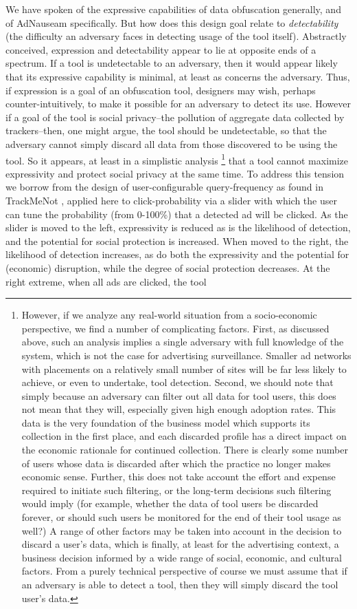 \documentclass[conference]{IEEEtran}
\begin{document}
We have spoken of the expressive capabilities of data obfuscation generally, and of AdNauseam specifically. But how does this design goal relate to \emph{detectability} (the difficulty an adversary faces in detecting usage of the tool itself). Abstractly conceived, expression and detectability appear to lie at opposite ends of a spectrum. If a tool is undetectable to an adversary, then it would appear likely that its expressive capability is minimal, at least as concerns the adversary. Thus, if expression is a goal of an obfuscation tool, designers may wish, perhaps counter-intuitively, to make it possible for an adversary to detect its use. However if a goal of the tool is social privacy--the pollution of aggregate data collected by trackers--then, one might argue, the tool should be undetectable, so that the adversary cannot simply discard all data from those discovered to be using the tool. So it appears, at least in a simplistic analysis \footnote{However, if we analyze any real-world situation from a socio-economic perspective, we find a number of complicating factors. First, as discussed above, such an analysis implies a single adversary with full knowledge of the system, which is not the case for advertising surveillance. Smaller ad networks with placements on a relatively small number of sites will be far less likely to achieve, or even to undertake, tool detection. Second, we should note that simply because an adversary can filter out all data for tool users, this does not mean that they will, especially given high enough adoption rates. This data is the very foundation of the business model which supports its collection in the first place, and each discarded profile has a direct impact on the economic rationale for continued collection. There is clearly some number of users whose data is discarded after which the practice no longer makes economic sense. Further, this does not take account the effort and expense required to initiate such filtering, or the long-term decisions such filtering would imply (for example, whether the data of tool users be discarded forever, or should such users be monitored for the end of their tool usage as well?) A range of other factors may be taken into account in the decision to discard a user's data, which is finally, at least for the advertising context, a business decision informed by a wide range of social, economic, and cultural factors. From a purely technical perspective of course we must assume that if an adversary is able to detect a tool, then they will simply discard the tool user's data.} that a tool cannot maximize expressivity and protect social privacy at the same time. To address this tension we borrow from the design of user-configurable query-frequency as found in TrackMeNot \cite{Howe-1}, applied here to click-probability via a slider with which the user can tune the probability (from 0-100\%) that a detected ad will be clicked.  As the slider is moved to the left, expressivity is reduced as is the likelihood of detection, and the potential for social protection is increased. When moved to the right, the likelihood of detection  increases, as do both the expressivity and the potential for (economic) disruption, while the degree of social protection decreases. At the right extreme, when all ads are clicked, the tool 
\end{document}
